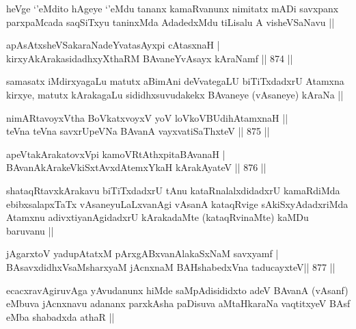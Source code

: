 \begin{artha}
heVge `\stext'eMdito hAgeye `\stext'eMdu tananx kamaRvanunx nimitatx mADi savxpanx parxpaMcada saqSiTxyu taninxMda AdadedxMdu tiLisalu A visheVSaNavu || 
\end{artha}


\begin{shl}
apAsAtxsheVSakaraNadeYvatasAyxpi cA\s \s tasxnaH | \\
kirxyAkArakasidadhxyXthaRM BAvaneYvAsayx kAraNamf \hfill||  874 ||  
\end{shl}

\begin{artha}
samasatx iMdirxyagaLu matutx aBimAni deVvategaLU biTiTxdadxrU Atamxna kirxye, matutx kArakagaLu sididhxsuvudakekx BAvaneye (vAsaneye) kAraNa ||
\end{artha}


\begin{shl}
nimARtavoyxV\s tha BoVkatxvoyxV yoV loVkoV\s BUdihA\s \s tamxnaH ||  \\
teVna teVna savxrUpeVNa BAvanA vayxvatiSaThxteV \hfill||  875 ||  
\end{shl}


\begin{shl}
apeVtakArakatovxV\s pi kamoVRtAthxpitaBAvanaH | \\
BAvanAkArakeVkiSxtAvxdAtemxYkaH kArakAyateV \hfill||  876 || 
\end{shl}

\begin{artha}
shataqRtavxkArakavu biTiTxdadxrU tAnu kataRnalalxdidadxrU kamaRdiMda ebibxsalapxTaTx vAsaneyuLaLxvanAgi vAsanA kataqRvige sAkiSxyAdadxriMda Atamxnu adivxtiyanAgidadxrU kArakadaMte (kataqRvinaMte) kaMDu baruvanu ||
\end{artha}


\begin{shl}
jAgarxtoV yadupAtatxM pArxgABxvanAlakaSxNaM savxyamf | \\
BAsavxdidhxVsaMsharxyaM jAcnxnaM BAHshabedxVna taducayxteV\hfill ||  877 ||  
\end{shl}

\begin{artha}
ecacxravAgiruvAga yAvudanunx hiMde saMpAdisididxto adeV BAvanA (vAsanf) eMbuva jAcnxnavu adananx parxkAsha paDisuva aMtaHkaraNa vaqtitxyeV BAsf eMba shabadxda athaR ||
\end{artha}

